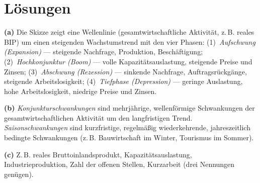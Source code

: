 \documentclass[11pt, a4paper]{article}
\begin{document}
\newpage
\section{Lösungen}\label{loesungen}

\begin{loesung}[title={Lösung Aufgabe~1 --- Konjunkturzyklus und Indikatoren}]
\textbf{(a)} Die Skizze zeigt eine Wellenlinie (gesamtwirtschaftliche Aktivität, z.\,B.
reales BIP) um einen steigenden Wachstumstrend mit den vier Phasen:
(1)~\emph{Aufschwung (Expansion)} --- steigende Nachfrage, Produktion, Beschäftigung;
(2)~\emph{Hochkonjunktur (Boom)} --- volle Kapazitätsauslastung, steigende Preise und
Zinsen; (3)~\emph{Abschwung (Rezession)} --- sinkende Nachfrage, Auftragsrückgänge,
steigende Arbeitslosigkeit; (4)~\emph{Tiefphase (Depression)} --- geringe Auslastung,
hohe Arbeitslosigkeit, niedrige Preise und Zinsen.

\textbf{(b)} \emph{Konjunkturschwankungen} sind mehrjährige, wellenförmige Schwankungen
der gesamtwirtschaftlichen Aktivität um den langfristigen Trend.
\emph{Saisonschwankungen} sind kurzfristige, regelmäßig wiederkehrende, jahreszeitlich
bedingte Schwankungen (z.\,B. Bauwirtschaft im Winter, Tourismus im Sommer).

\textbf{(c)} Z.\,B. reales Bruttoinlandsprodukt, Kapazitätsauslastung,
Industrieproduktion, Zahl der offenen Stellen, Kurzarbeit (drei Nennungen genügen).
\end{loesung}
\end{document}
